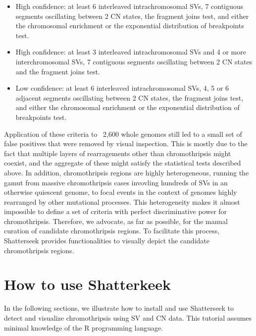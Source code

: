 \documentclass[twoside,a4wide,11pt]{article}\usepackage[]{graphicx}\usepackage[]{color}
\begin{document}
\begin{itemize}

\item High confidence: at least 6 interleaved intrachromosomal SVs, 7 contiguous segments oscillating between 2 CN states, 
the fragment joins test, and either the chromosomal enrichment or the exponential distribution of breakpoints test.

\item High confidence: at least 3 interleaved intrachromosomal SVs and 4 or more interchromosomal SVs, 7 contiguous segments oscillating between 2 CN states and the fragment joins test.

\item Low confidence: at least 6 interleaved intrachromosomal SVs, 4, 5 or 6 adjacent segments oscillating between 2 CN states, the fragment joins test, and either the chromosomal enrichment or the exponential distribution of breakpoints test.

\end{itemize}

Application of these criteria to ~2,600 whole genomes still led to a small set of false positives that were removed by visual inspection. 
This is mostly due to the fact that multiple layers of rearragements other than chromothripsis might coexist, and the aggregate of these might satisfy the statistical tests described above.
In addition, chromothripsis regions are highly heterogeneous, running the gamut from massive chromothripsis cases 
invovling hundreds of SVs in an otherwise quiescent genome, 
to focal events in the context of genomes highly rearranged by other mutational processes.
This heterogeneity makes it almost impossible to define a set of criteria with perfect
discriminative power for chromothripsis.
Therefore, we advocate, as far as possible, for the manual curation of candidate chromothripsis regions. 
To facilitate this process, Shatterseek provides functionalities to visually depict the candidate chromothripsis regions. 


\section{How to use Shatterkeek}
In the following sections, we illustrate how to install and use Shatterseek to detect and visualize chromothripsis 
using SV and CN data. 
This tutorial assumes minimal knowledge of the R programming language.
\end{document}

